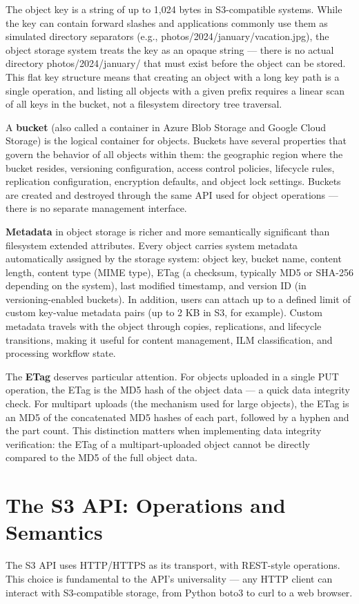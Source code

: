 The object key is a string of up to 1,024 bytes in S3-compatible systems. While the key can contain forward slashes and applications commonly use them as simulated directory separators (e.g., photos/2024/january/vacation.jpg), the object storage system treats the key as an opaque string --- there is no actual directory photos/2024/january/ that must exist before the object can be stored. This flat key structure means that creating an object with a long key path is a single operation, and listing all objects with a given prefix requires a linear scan of all keys in the bucket, not a filesystem directory tree traversal.

A \textbf{bucket} (also called a container in Azure Blob Storage and Google Cloud Storage) is the logical container for objects. Buckets have several properties that govern the behavior of all objects within them: the geographic region where the bucket resides, versioning configuration, access control policies, lifecycle rules, replication configuration, encryption defaults, and object lock settings. Buckets are created and destroyed through the same API used for object operations --- there is no separate management interface.

\textbf{Metadata} in object storage is richer and more semantically significant than filesystem extended attributes. Every object carries system metadata automatically assigned by the storage system: object key, bucket name, content length, content type (MIME type), ETag (a checksum, typically MD5 or SHA-256 depending on the system), last modified timestamp, and version ID (in versioning-enabled buckets). In addition, users can attach up to a defined limit of custom key-value metadata pairs (up to 2 KB in S3, for example). Custom metadata travels with the object through copies, replications, and lifecycle transitions, making it useful for content management, ILM classification, and processing workflow state.

The \textbf{ETag} deserves particular attention. For objects uploaded in a single PUT operation, the ETag is the MD5 hash of the object data --- a quick data integrity check. For multipart uploads (the mechanism used for large objects), the ETag is an MD5 of the concatenated MD5 hashes of each part, followed by a hyphen and the part count. This distinction matters when implementing data integrity verification: the ETag of a multipart-uploaded object cannot be directly compared to the MD5 of the full object data.

\section{The S3 API: Operations and Semantics}
The S3 API uses HTTP/HTTPS as its transport, with REST-style operations. This choice is fundamental to the API's universality --- any HTTP client can interact with S3-compatible storage, from Python boto3 to curl to a web browser.

